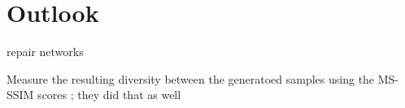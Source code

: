 \section{Outlook}\label{ausblick}


repair networks
\cite{Tanno2022repairingneuralnetworkfromcorrupt}


Measure the resulting diversity between the generatoed samples using the MS-SSIM scores \cite{Odena201710.5555/3305890.3305954}; they did that as well


\newpage
